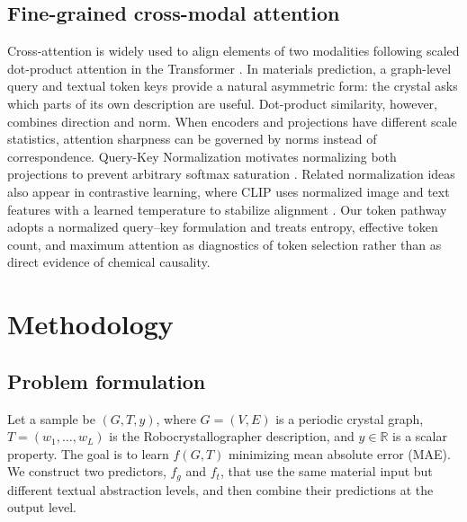 \documentclass[a4paper,fleqn]{cas-sc}
\begin{document}
\subsection{Fine-grained cross-modal attention}
Cross-attention is widely used to align elements of two modalities following scaled dot-product attention in the Transformer \citep{vaswani2017attention}. In materials prediction, a graph-level query and textual token keys provide a natural asymmetric form: the crystal asks which parts of its own description are useful. Dot-product similarity, however, combines direction and norm. When encoders and projections have different scale statistics, attention sharpness can be governed by norms instead of correspondence. Query-Key Normalization motivates normalizing both projections to prevent arbitrary softmax saturation \citep{henry2020qknorm}. Related normalization ideas also appear in contrastive learning, where CLIP uses normalized image and text features with a learned temperature to stabilize alignment \citep{radford2021clip}. Our token pathway adopts a normalized query--key formulation and treats entropy, effective token count, and maximum attention as diagnostics of token selection rather than as direct evidence of chemical causality.

\FloatBarrier
\section{Methodology}
\subsection{Problem formulation}
Let a sample be $(G,T,y)$, where $G=(V,E)$ is a periodic crystal graph, $T=(w_1,\ldots,w_L)$ is the Robocrystallographer description, and $y\in\mathbb{R}$ is a scalar property. The goal is to learn $f(G,T)$ minimizing mean absolute error (MAE). We construct two predictors, $f_g$ and $f_t$, that use the same material input but different textual abstraction levels, and then combine their predictions at the output level.
\end{document}
